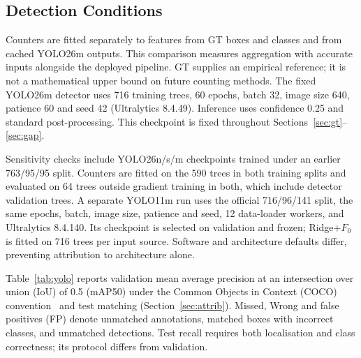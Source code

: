 \documentclass[conference,a4paper]{IEEEtran}
\begin{document}
\subsection{Detection Conditions}
Counters are fitted separately to features from GT boxes and classes and from
cached YOLO26m outputs. This comparison measures aggregation with accurate
inputs alongside the deployed pipeline. GT supplies an empirical reference;
it is not a mathematical upper bound on future counting methods. The fixed YOLO26m detector uses 716 training trees, 60 epochs,
batch 32, image size 640, patience 60 and seed 42 (Ultralytics 8.4.49). Inference
uses confidence 0.25 and standard post-processing. This checkpoint is fixed
throughout Sections~\ref{sec:gt}--\ref{sec:gap}.

Sensitivity checks include YOLO26n/s/m checkpoints trained under an earlier
763/95/95 split. Counters are fitted on the 590 trees in both training splits
and evaluated on 64 trees outside gradient training in both, which include
detector validation trees. A separate YOLO11m run uses the official 716/96/141 split,
the same epochs, batch, image size, patience and seed, 12 data-loader workers,
and Ultralytics 8.4.140. Its checkpoint is selected on validation and frozen;
Ridge$+F_0$ is fitted on 716 trees per input source. Software and architecture
defaults differ, preventing attribution to architecture alone.

Table~\ref{tab:yolo} reports validation mean average precision at an
intersection over union (IoU) of 0.5 (mAP50) under the Common Objects in
Context (COCO) convention~\cite{ref16} and test matching
(Section~\ref{sec:attrib}). Missed, Wrong and false positives (FP) denote
unmatched annotations, matched boxes with incorrect classes, and unmatched
detections. Test recall requires both localisation and class
correctness; its protocol differs from validation.
\end{document}
